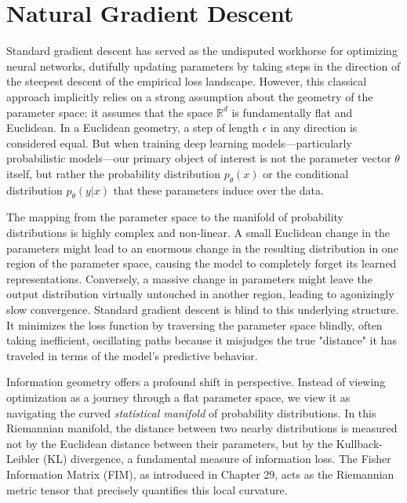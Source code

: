 \chapter{Natural Gradient Descent}
\label{ch:natural_gradient}

Standard gradient descent has served as the undisputed workhorse for optimizing neural networks, dutifully updating parameters by taking steps in the direction of the steepest descent of the empirical loss landscape. However, this classical approach implicitly relies on a strong assumption about the geometry of the parameter space: it assumes that the space $\mathbb{R}^d$ is fundamentally flat and Euclidean. In a Euclidean geometry, a step of length $\epsilon$ in any direction is considered equal. But when training deep learning models—particularly probabilistic models—our primary object of interest is not the parameter vector $\theta$ itself, but rather the probability distribution $p_\theta(x)$ or the conditional distribution $p_\theta(y|x)$ that these parameters induce over the data. 

The mapping from the parameter space to the manifold of probability distributions is highly complex and non-linear. A small Euclidean change in the parameters might lead to an enormous change in the resulting distribution in one region of the parameter space, causing the model to completely forget its learned representations. Conversely, a massive change in parameters might leave the output distribution virtually untouched in another region, leading to agonizingly slow convergence. Standard gradient descent is blind to this underlying structure. It minimizes the loss function by traversing the parameter space blindly, often taking inefficient, oscillating paths because it misjudges the true "distance" it has traveled in terms of the model's predictive behavior.

Information geometry offers a profound shift in perspective. Instead of viewing optimization as a journey through a flat parameter space, we view it as navigating the curved \textit{statistical manifold} of probability distributions. In this Riemannian manifold, the distance between two nearby distributions is measured not by the Euclidean distance between their parameters, but by the Kullback-Leibler (KL) divergence, a fundamental measure of information loss. The Fisher Information Matrix (FIM), as introduced in Chapter 29, acts as the Riemannian metric tensor that precisely quantifies this local curvature.

